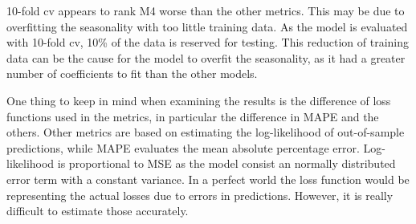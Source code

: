 \documentclass[english, 12pt, a4paper, sci, utf8, a-1b, online]{aaltothesis}
\begin{document}
10-fold cv appears to rank M4 worse than the other metrics. This may be due to overfitting the seasonality with too little training data. As the model is evaluated with 10-fold cv, 10\% of the data is reserved for testing. This reduction of training data can be the cause for the model to overfit the seasonality, as it had a greater number of coefficients to fit than the other models.


One thing to keep in mind when examining the results is the difference of loss functions used in the metrics, in particular the difference in MAPE and the others. Other metrics are based on estimating the log-likelihood of out-of-sample predictions, while MAPE evaluates the mean absolute percentage error. Log-likelihood is proportional to MSE as the model consist an normally distributed error term with a constant variance. In a perfect world the loss function would be representing the actual losses due to errors in predictions. However, it is really difficult to estimate those accurately. 


\end{document}
